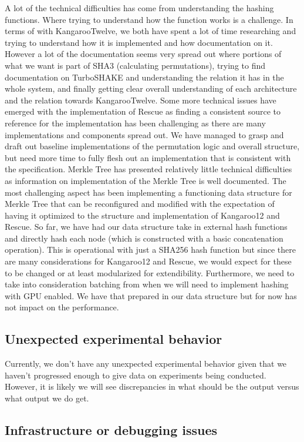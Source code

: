 \documentclass[conference]{IEEEtran}
\begin{document}
A lot of the technical difficulties has come from understanding the hashing functions. Where trying to understand how the function works is a challenge. In terms of with KangarooTwelve, we both have spent a lot of time researching and trying to understand how it is implemented and how documentation on it. However a lot of the documentation seems very spread out where portions of what we want is part of SHA3 (calculating permutations), trying to find documentation on TurboSHAKE and understanding the relation it has in the whole system, and finally getting clear overall understanding of each architecture and the relation towards KangarooTwelve. 
Some more technical issues have emerged with the implementation of Rescue as finding a consistent source to reference for the implementation has been challenging as there are many implementations and components spread out. We have managed to grasp and draft out baseline implementations of the permutation logic and overall structure, but need more time to fully flesh out an implementation that is consistent with the specification.
Merkle Tree has presented relatively little technical difficulties as information on implementation of the Merkle Tree is well documented. The most challenging aspect has been implementing a functioning data structure for Merkle Tree that can be reconfigured and modified with the expectation of having it optimized to the structure and implementation of Kangaroo12 and Rescue. So far, we have had our data structure take in external hash functions and directly hash each node (which is constructed with a basic concatenation operation). This is operational with just a SHA256 hash function but since there are many considerations for Kangaroo12 and Rescue, we would expect for these to be changed or at least modularized for extendibility. Furthermore, we need to take into consideration batching from when we will need to implement hashing with GPU enabled. We have that prepared in our data structure but for now has not impact on the performance.
\subsection{Unexpected experimental behavior}

Currently, we don't have any unexpected experimental behavior given that we haven't progressed enough to give data on experiments being conducted. However, it is likely we will see discrepancies in what should be the output versus what output we do get.

\subsection{Infrastructure or debugging issues}
\end{document}
